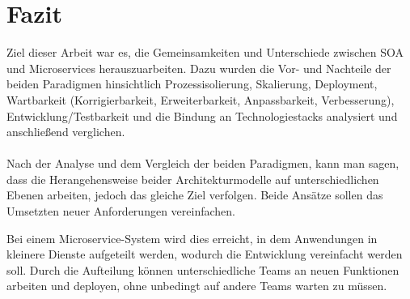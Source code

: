 \chapter{Fazit}
\label{chap:Fazit}
Ziel dieser Arbeit war es, die Gemeinsamkeiten und Unterschiede zwischen SOA und Microservices herauszuarbeiten. Dazu wurden die Vor- und Nachteile der beiden Paradigmen hinsichtlich Prozessisolierung, Skalierung, Deployment, Wartbarkeit (Korrigierbarkeit, Erweiterbarkeit, Anpassbarkeit, Verbesserung), Entwicklung/Testbarkeit und die Bindung an Technologiestacks analysiert und anschließend verglichen.
\\\\
Nach der Analyse und dem Vergleich der beiden Paradigmen, kann man sagen, dass die Herangehensweise beider Architekturmodelle auf unterschiedlichen Ebenen arbeiten, jedoch das gleiche Ziel verfolgen. Beide Ansätze sollen das Umsetzten neuer Anforderungen vereinfachen.

Bei einem Microservice-System wird dies erreicht, in dem Anwendungen in kleinere Dienste aufgeteilt werden, wodurch die Entwicklung vereinfacht werden soll. Durch die Aufteilung können unterschiedliche Teams an neuen Funktionen arbeiten und deployen, ohne unbedingt auf andere Teams warten zu müssen.


